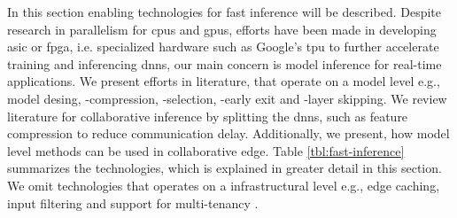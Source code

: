 In this section enabling technologies for fast inference will be described. Despite research in parallelism for \gls{cpu}s and \gls{gpu}s, efforts have been made in developing \gls{asic} or \gls{fpga}, i.e. specialized hardware such as Google's \gls{tpu} to further accelerate training and inferencing \gls{dnn}s, our main concern is model inference for real-time applications. We present efforts in literature, that operate on a model level e.g., model desing, -compression, -selection, -early exit and -layer skipping. We review literature for collaborative inference by splitting the \gls{dnn}s, such as feature compression to reduce communication delay. Additionally, we present, how model level methods can be used in collaborative edge. Table \ref{tbl:fast-inference} summarizes the technologies, which is explained in greater detail in this section. We omit technologies that operates on a infrastructural level e.g., edge caching, input filtering and support for multi-tenancy \cite{zhou_edge_2019}.
